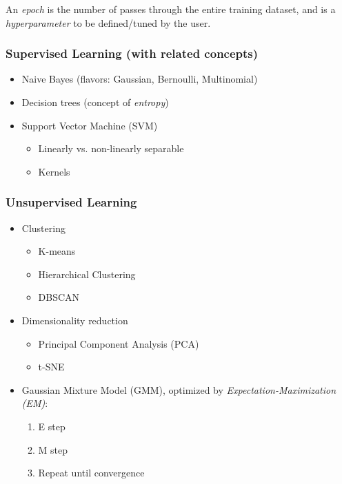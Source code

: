 \documentclass[10pt,landscape,letterpaper]{cheatsheet}
\begin{document}
\begin{multicols}{3}
An \emph{epoch} is the number of passes through the entire training dataset, and is a \emph{hyperparameter} to be defined/tuned by the user.


\subsubsection{Supervised Learning (with related concepts)}

\begin{itemize}
    \item Naive Bayes (flavors: Gaussian, Bernoulli, Multinomial)
    \item Decision trees (concept of \emph{entropy})
    \item Support Vector Machine (SVM)
    \begin{itemize}
        \item Linearly vs. non-linearly separable
        \item Kernels
    \end{itemize}
\end{itemize}

\subsubsection{Unsupervised Learning}

\begin{itemize}
    \item Clustering
    \begin{itemize}
        \item K-means
        \item Hierarchical Clustering
        \item DBSCAN
    \end{itemize}
    \item Dimensionality reduction
    \begin{itemize}
        \item Principal Component Analysis (PCA)
        \item t-SNE
    \end{itemize}
    \item Gaussian Mixture Model (GMM), optimized by \emph{Expectation-Maximization (EM)}:
    \begin{enumerate}
        \item E step
        \item M step
        \item[] Repeat until convergence
    \end{enumerate}
\end{itemize}


\end{multicols}
\end{document}
